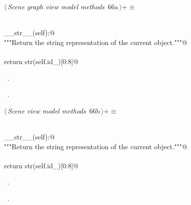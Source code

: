 \documentclass[
    a4paper,      %
    10pt,         %
    openright,    %
    notitlepage,  %
    parskip=half, %
]{scrreprt}       %
\theoremstyle{definition}                    %
\begin{document}
\begin{flushleft} \small
\begin{minipage}{\linewidth}\label{scrap112}\raggedright\small
{} $\langle\,${\itshape Scene graph view model methods}\nobreak\ {\footnotesize {66a}}$\,\rangle+\equiv$
\vspace{-1ex}
\begin{list}{}{} \item
\mbox{}\lstinline@@\\
\mbox{}\lstinline@def __str__(self):@\\
\mbox{}\lstinline@    """Return the string representation of the current object."""@\\
\mbox{}\lstinline@@\\
\mbox{}\lstinline@    return str(self.id_)[0:8]@\\
\mbox{}\lstinline@@{\NWsep}
\end{list}
\vspace{-1.5ex}
\footnotesize
\begin{list}{}{\setlength{\itemsep}{-\parsep}\setlength{\itemindent}{-\leftmargin}}
\item \NWtxtMacroDefBy\ .
\item \NWtxtMacroRefIn\ .

\item{}
\end{list}
\end{minipage}\vspace{4ex}
\end{flushleft}
\begin{flushleft} \small
\begin{minipage}{\linewidth}\label{scrap113}\raggedright\small
{} $\langle\,${\itshape Scene view model methods}\nobreak\ {\footnotesize {66b}}$\,\rangle+\equiv$
\vspace{-1ex}
\begin{list}{}{} \item
\mbox{}\lstinline@@\\
\mbox{}\lstinline@def __str__(self):@\\
\mbox{}\lstinline@    """Return the string representation of the current object."""@\\
\mbox{}\lstinline@@\\
\mbox{}\lstinline@    return str(self.id_)[0:8]@\\
\mbox{}\lstinline@@{\NWsep}
\end{list}
\vspace{-1.5ex}
\footnotesize
\begin{list}{}{\setlength{\itemsep}{-\parsep}\setlength{\itemindent}{-\leftmargin}}
\item \NWtxtMacroDefBy\ .
\item \NWtxtMacroRefIn\ .

\item{}
\end{list}
\end{minipage}\vspace{4ex}
\end{flushleft}
\end{document}
